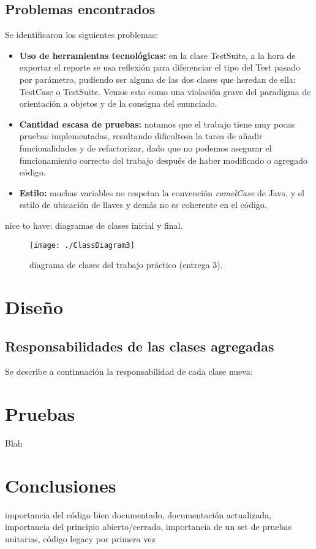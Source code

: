 \documentclass[12pt]{article}
\begin{document}
\subsection{Problemas encontrados}
Se identificaron los siguientes problemas:

\begin{itemize}
	\item \textbf{Uso de herramientas tecnológicas:} en la clase TestSuite, a la hora de exportar
		el reporte se usa reflexión para diferenciar el tipo del Test pasado por parámetro,
		pudiendo ser alguna de las dos clases que heredan de ella: TestCase o TestSuite.
		Vemos esto como una violación grave del paradigma de orientación a objetos y de la
		consigna del enunciado.
	
	\item \textbf{Cantidad escasa de pruebas:} notamos que el trabajo tiene muy pocas pruebas
		implementadas, resultando dificultosa la tarea de añadir funcionalidades y
		de refactorizar, dado que no podemos asegurar el funcionamiento correcto del trabajo
		después de haber modificado o agregado código.		 

	\item \textbf{Estilo:} muchas variables no respetan la convención \textit{camelCase} 
		de Java, y el estilo de ubicación de llaves y demás no es coherente en el
		código.
		
\end{itemize}


nice to have: diagramas de clases inicial y final.
\begin{figure}[h!]
\begin{center}
	\texttt{[image: ./ClassDiagram3]}
\end{center}
	\caption{diagrama de clases del trabajo práctico (entrega 3).}
\end{figure}

	
\section{Diseño}

\subsection{Responsabilidades de las clases agregadas}
Se describe a continuación la responsabilidad de cada clase nueva:
\begin{itemize}
\end{itemize}

\section{Pruebas}
Blah
	
\section{Conclusiones}
importancia del código bien documentado, documentación actualizada, importancia del principio abierto/cerrado, importancia de un
set de pruebas unitarias, código legacy por primera vez
\end{document}
